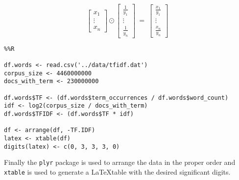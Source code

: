 \documentclass[12pt, a4paper]{article}
\newcommand{\code}[1]{\texttt{#1}}
\begin{document}
\vspace{2em}
$$
\begin{bmatrix}
    x_1\\
    \vdots\\
    x_n
\end{bmatrix} \odot
\begin{bmatrix}
    \frac{1}{y_1}\\
    \vdots\\
    \frac{1}{y_n}
\end{bmatrix}\:=\:
\begin{bmatrix}
    \frac{x_1}{y_1}\\
    \vdots\\
    \frac{x_n}{y_n}
\end{bmatrix}
$$

\begin{minipage}{\linewidth} %
\vspace{3em}
\begin{verbatim}
%%R

df.words <- read.csv('../data/tfidf.dat')
corpus_size <- 4460000000
docs_with_term <- 230000000

df.words$TF <- (df.words$term_occurrences / df.words$word_count)
idf <- log2(corpus_size / docs_with_term)
df.words$TFIDF <- (df.words$TF * idf)

df <- arrange(df, -TF.IDF)
latex <- xtable(df)
digits(latex) <- c(0, 3, 3, 3, 0)
\end{verbatim}
\vspace{2em}
\end{minipage}

\newpage
Finally the \code{plyr} package is used to arrange the data in
the proper order and \code{xtable} is used to generate a \LaTeX table
with the desired significant digits.
\end{document}
